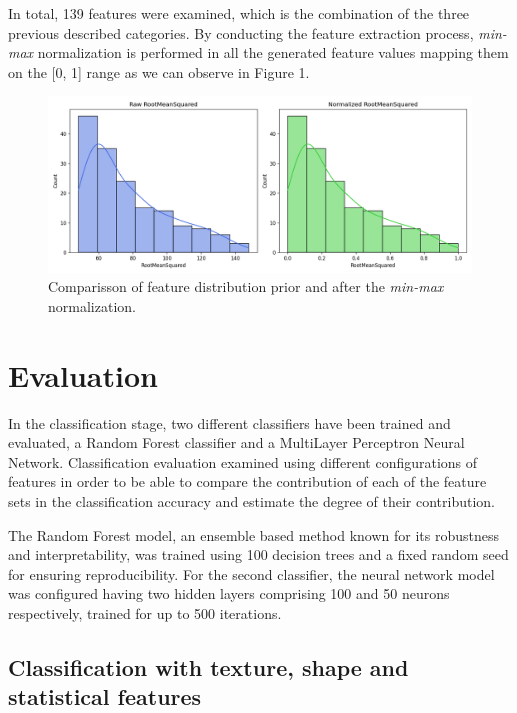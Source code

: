 \documentclass[11pt,a4paper]{article}
\begin{document}
	
	In total, 139 features were examined, which is the combination of the three previous described categories.
	By conducting the feature extraction process, \textit{min-max} normalization is performed in all the generated feature values
	mapping them on the [0, 1] range as we can observe in Figure 1. 
		\begin{figure}[h]
			\centering
			\includegraphics[width=1.1\textwidth]{images/RootMeanSquared.png}
			\caption{Comparisson of feature distribution prior and after the \textit{min-max} normalization.}
			\label{fig1:}
		\end{figure}		



    \section{Evaluation}
		
		\par In the classification stage, two different classifiers have been trained and evaluated, a Random Forest classifier
		and a MultiLayer Perceptron Neural Network. Classification evaluation examined using different configurations of features
		in order to be able to compare the contribution of each of the feature sets in the classification accuracy and estimate
		the degree of their contribution.

		The Random Forest model, an ensemble based method known for its robustness and interpretability, 
		was trained using 100 decision trees and a fixed random seed for ensuring reproducibility. 
		For the second classifier, the neural network model was configured having
		two hidden layers comprising 100 and 50 neurons respectively, trained 
		for up to 500 iterations.

	\subsection{Classification with texture, shape and statistical features}
\end{document}
